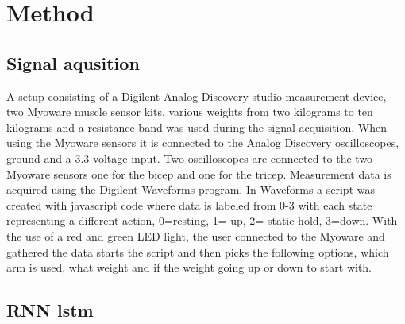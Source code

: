 \section{Method}
\label{section:method}



\subsection{Signal aqusition}
A setup consisting of a Digilent Analog Discovery studio measurement device, two Myoware muscle sensor kits, various weights from two kilograms to ten kilograms and a resistance band was used during the signal acquisition.
When using the Myoware sensors it is connected to the Analog Discovery oscilloscopes, ground and a 3.3 voltage input. Two oscilloscopes are connected to the two Myoware sensors one for the bicep and one for the tricep.
Measurement data is acquired using the Digilent Waveforms program. In Waveforms a script was created with javascript code where data is labeled from 0-3 with each state representing a different action,
0=resting, 1= up, 2= static hold, 3=down. With the use of a red and green LED light, the user connected to the Myoware and gathered the data starts the script and then picks the following options, 
which arm is used, what weight and if the weight going up or down to start with.      


\subsection{RNN lstm}

